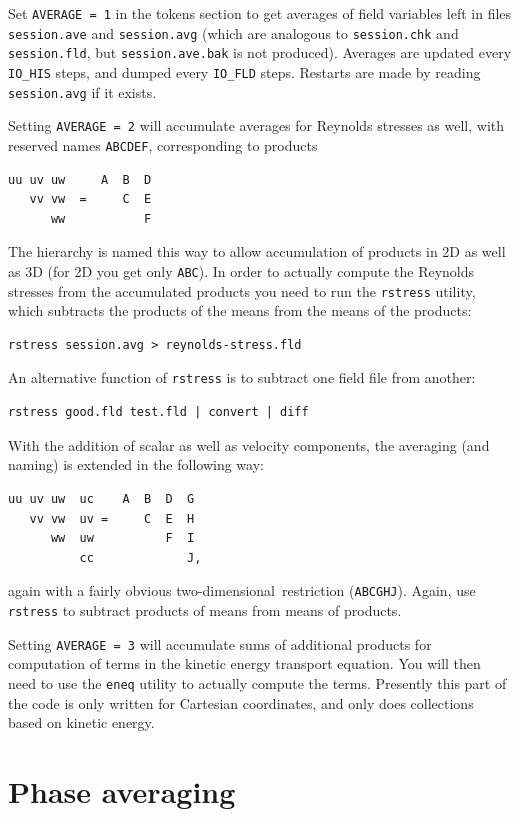 \documentclass[11pt]{report}
\newcommand\twod{two-di\-men\-sion\-al}
\begin{document}
Set \verb+AVERAGE = 1+ in the tokens section to get averages of field
variables left in files \verb+session.ave+ and \verb+session.avg+
(which are analogous to \verb+session.chk+ and \verb+session.fld+, but
\verb+session.ave.bak+ is not produced).  Averages are updated
every \verb+IO_HIS+ steps, and dumped every \verb+IO_FLD+ steps.
Restarts are made by reading \verb+session.avg+ if it exists.

Setting \verb+AVERAGE = 2+ will accumulate averages for Reynolds
stresses as well, with reserved names \verb+ABCDEF+, corresponding to
products
%
{\small
\begin{verbatim}
uu uv uw     A  B  D
   vv vw  =     C  E
      ww           F
\end{verbatim}
}
%
The hierarchy is named this way to allow accumulation of products in 2D
as well as 3D (for 2D you get only \verb+ABC+).  In order to actually
compute the Reynolds stresses from the accumulated products you need
to run the \verb+rstress+ utility, which subtracts the products of the
means from the means of the products:
\begin{verbatim}
rstress session.avg > reynolds-stress.fld
\end{verbatim}
An alternative function of \verb+rstress+ is to subtract one field
file from another:
\begin{verbatim}
rstress good.fld test.fld | convert | diff
\end{verbatim}

With the addition of scalar as well as velocity components, the
averaging (and naming) is extended in the following way:
%
{\small
\begin{verbatim}
uu uv uw  uc    A  B  D  G
   vv vw  uv =     C  E  H
      ww  uw          F  I
          cc             J,
\end{verbatim}
}
%
\noindent
again with a fairly obvious \twod\ restriction (\verb|ABCGHJ|).
Again, use \verb|rstress| to subtract products of means from means
of products.

Setting \verb+AVERAGE = 3+ will accumulate sums of additional products
for computation of terms in the kinetic energy transport equation. You
will then need to use the \verb+eneq+ utility to actually compute the
terms. Presently this part of the code is only written for Cartesian
coordinates, and only does collections based on kinetic energy.

\section{Phase averaging}
\label{sec.phase}
\end{document}
